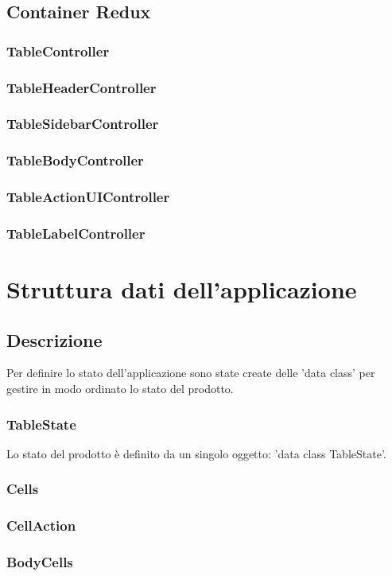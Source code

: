 \subsection{Container Redux}
\subsubsection{TableController}
\subsubsection{TableHeaderController}
\subsubsection{TableSidebarController}
\subsubsection{TableBodyController}
\subsubsection{TableActionUIController}
\subsubsection{TableLabelController}


\section{Struttura dati dell'applicazione}
\subsection{Descrizione}
Per definire lo stato dell'applicazione sono state create delle 'data class' per gestire in modo ordinato lo stato del prodotto.
\subsubsection{TableState}
Lo stato del prodotto è definito da un singolo oggetto: 'data class TableState'.
\subsubsection{Cells}
\subsubsection{CellAction}
\subsubsection{BodyCells}


